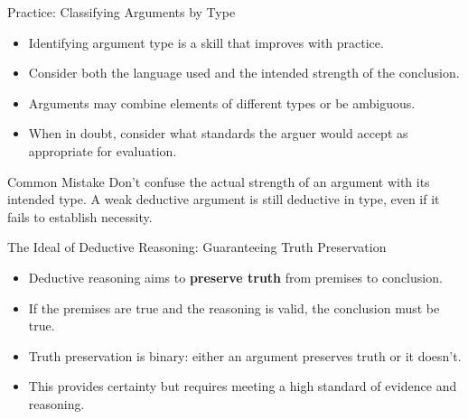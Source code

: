 \documentclass{beamer}
\begin{document}
\begin{frame}{Practice: Classifying Arguments by Type}
    \begin{itemize}
        \item Identifying argument type is a skill that improves with practice.
        \item Consider both the language used and the intended strength of the conclusion.
        \item Arguments may combine elements of different types or be ambiguous.
        \item When in doubt, consider what standards the arguer would accept as appropriate for evaluation.
    \end{itemize}
    
    \begin{alertblock}{Common Mistake}
        Don't confuse the actual strength of an argument with its intended type. A weak deductive argument is still deductive in type, even if it fails to establish necessity.
    \end{alertblock}
\end{frame}

\begin{frame}{The Ideal of Deductive Reasoning: Guaranteeing Truth Preservation}
    \begin{itemize}
        \item Deductive reasoning aims to \textbf{preserve truth} from premises to conclusion.
        \item If the premises are true and the reasoning is valid, the conclusion must be true.
        \item Truth preservation is binary: either an argument preserves truth or it doesn't.
        \item This provides certainty but requires meeting a high standard of evidence and reasoning.
    \end{itemize}
    
\end{frame}
\end{document}
